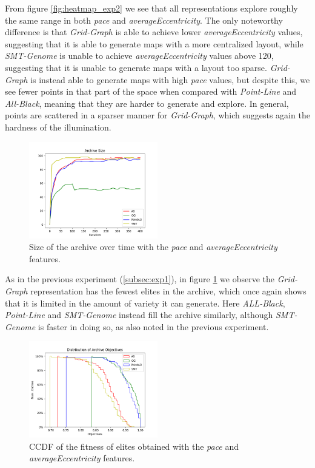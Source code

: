 From figure \ref{fig:heatmap_exp2} we see that all representations explore roughly the same range in both \textit{pace} and \textit{averageEccentricity}. The only noteworthy difference is that \textit{Grid-Graph} is able to achieve lower \textit{averageEccentricity} values, suggesting that it is able to generate maps with a more centralized layout, while \textit{SMT-Genome} is unable to achieve \textit{averageEccentricity} values above 120, suggesting that it is unable to generate maps with a layout too sparse. \textit{Grid-Graph} is instead able to generate maps with high \textit{pace} values, but despite this, we see fewer points in that part of the space when compared with \textit{Point-Line} and \textit{All-Black}, meaning that they are harder to generate and explore. In general, points are scattered in a sparser manner for \textit{Grid-Graph}, which suggests again the hardness of the illumination.

\begin{figure}[H]
    \centering
    \includegraphics[width=0.5\textwidth]{images/Exp2/archive_size.png}
    \caption{Size of the archive over time with the \textit{pace} and \textit{averageEccentricity} features.}
    \label{fig:archive_size_exp2}
\end{figure}

As in the previous experiment (\ref{subsec:exp1}), in figure \ref{fig:archive_size_exp2} we observe the \textit{Grid-Graph} representation has the fewest elites in the archive, which once again shows that it is limited in the amount of variety it can generate. Here \textit{ALL-Black}, \textit{Point-Line} and \textit{SMT-Genome} instead fill the archive similarly, although \textit{SMT-Genome} is faster in doing so, as also noted in the previous experiment. 

\begin{figure}[H]
    \centering
    \includegraphics[width=0.5\textwidth]{images/Exp2/archive_ccdf.png}
    \caption{CCDF of the fitness of elites obtained with the \textit{pace} and \textit{averageEccentricity} features.}
    \label{fig:ccdf_exp2}
\end{figure}

